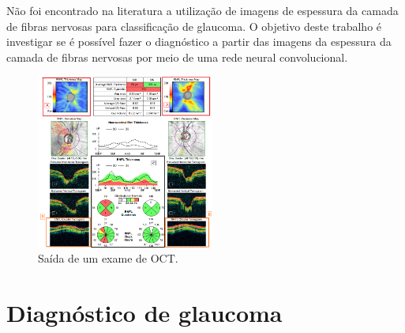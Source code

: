 \documentclass[conference]{IEEEtran}
\begin{document}
Não foi encontrado na literatura a utilização de imagens de espessura da camada de fibras nervosas para classificação de glaucoma. O objetivo deste trabalho é investigar se é possível fazer o diagnóstico a partir das imagens da espessura da camada de fibras nervosas por meio de uma rede neural convolucional.


\begin{figure}[!b]
  \centering
  \includegraphics[width=2.3in]{img/oct_regiao.png}
  \caption{Saída de um exame de OCT.}
  \label{fig:oct}
\end{figure}


\section{Diagnóstico de glaucoma}


\end{document}
